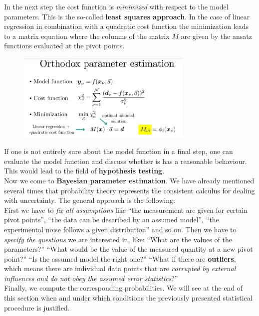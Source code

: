 \documentclass[12pt, a4paper]{scrartcl}
\begin{document}
In the next step the cost function is \textit{minimized} with respect to the model parameters. This 
is the so-called \textbf{least squares approach}. In the case of linear regression in combination 
with a quadratic cost function the
minimization leads to a matrix equation where the columns of the matrix $M$ are given by the ansatz
functions evaluated at the pivot points.\\%
\begin{figure}[H]
	\centering
	\includegraphics[width=0.75\textwidth]{7_2.png}
\end{figure}

If one is not entirely sure about the model function in a final step, one can evaluate the model function and
discuss whether is has a reasonable behaviour. 
This would lead to the field of \textbf{hypothesis testing}.\\


Now we come to \textbf{Bayesian parameter estimation}.
We have already mentioned several times that probability theory represents the consistent
calculus for dealing with uncertainty. The general approach is the following:\\

First we have to \textit{fix all assumptions} like ``the measurement are given for certain pivot points'',
``the data can be described by an assumed model'', ``the experimental noise follows a given distribution'' 
and so on. Then we have to \textit{specify the questions} we are interested in, like: ``What 
are the values of the parameters?'' ``What would be the value of the measured quantity at a new pivot point?''
``Is the assumed model the right one?'' ``What if there are \textbf{outliers}, which means there are individual data points that are \textit{corrupted
by external influences and do not obey the assumed error statistics}?''\\

Finally, we compute the corresponding probabilities. 
We will see at the end of this section when and under which conditions the previously presented statistical procedure is justified. \\
\end{document}
